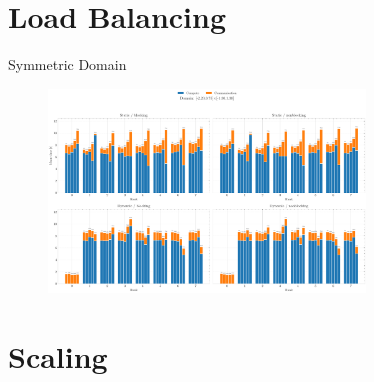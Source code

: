 
\section{Load Balancing}

\begin{frame}{Symmetric Domain}
  \begin{figure}
    \begin{center}
      \includegraphics[width=0.75\textwidth]{figures/Plots/2_load_balancing/2.0Ranks_2_20_0_75_1_30_1_30.pdf}
    \end{center}
  \end{figure}
    
\end{frame}


\section{Scaling}\label{sec:scaling} %


